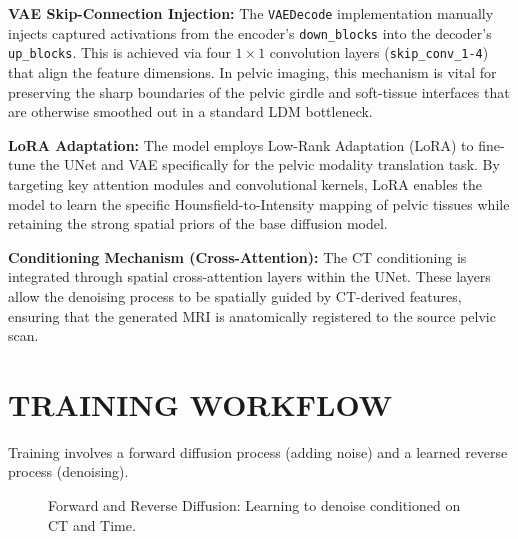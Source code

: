 \documentclass[10pt,a4paper]{article}
\begin{document}
\textbf{VAE Skip-Connection Injection:} 
The \texttt{VAEDecode} implementation manually injects captured activations from the encoder's \texttt{down\_blocks} into the decoder's \texttt{up\_blocks}. This is achieved via four $1 \times 1$ convolution layers (\texttt{skip\_conv\_1-4}) that align the feature dimensions. In pelvic imaging, this mechanism is vital for preserving the sharp boundaries of the pelvic girdle and soft-tissue interfaces that are otherwise smoothed out in a standard LDM bottleneck.

\textbf{LoRA Adaptation:} 
The model employs Low-Rank Adaptation (LoRA) to fine-tune the UNet and VAE specifically for the pelvic modality translation task. By targeting key attention modules and convolutional kernels, LoRA enables the model to learn the specific Hounsfield-to-Intensity mapping of pelvic tissues while retaining the strong spatial priors of the base diffusion model.

\textbf{Conditioning Mechanism (Cross-Attention):} 
The CT conditioning is integrated through spatial cross-attention layers within the UNet. These layers allow the denoising process to be spatially guided by CT-derived features, ensuring that the generated MRI is anatomically registered to the source pelvic scan.

\section{TRAINING WORKFLOW}
Training involves a forward diffusion process (adding noise) and a learned reverse process (denoising).

\begin{figure}[H]
\centering
{}
\caption{Forward and Reverse Diffusion: Learning to denoise conditioned on CT and Time.}
\end{figure}
\end{document}
